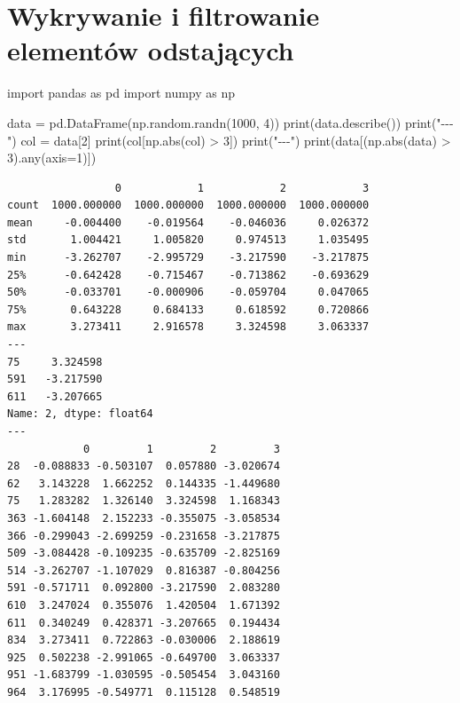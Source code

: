\documentclass[
  polish,
  letterpaper,
  DIV=11,
  numbers=noendperiod]{scrreprt}
\newenvironment{Shaded}{\begin{snugshade}}{\end{snugshade}}
\newcommand{\BuiltInTok}[1]{\textcolor[rgb]{0.00,0.23,0.31}{#1}}
\newcommand{\DecValTok}[1]{\textcolor[rgb]{0.68,0.00,0.00}{#1}}
\newcommand{\ImportTok}[1]{\textcolor[rgb]{0.00,0.46,0.62}{#1}}
\newcommand{\NormalTok}[1]{\textcolor[rgb]{0.00,0.23,0.31}{#1}}
\newcommand{\OperatorTok}[1]{\textcolor[rgb]{0.37,0.37,0.37}{#1}}
\newcommand{\StringTok}[1]{\textcolor[rgb]{0.13,0.47,0.30}{#1}}
\begin{document}
\section{Wykrywanie i filtrowanie elementów
odstających}\label{wykrywanie-i-filtrowanie-elementuxf3w-odstajux105cych}

\begin{Shaded}
\begin{Highlighting}[]
\ImportTok{import}\NormalTok{ pandas }\ImportTok{as}\NormalTok{ pd}
\ImportTok{import}\NormalTok{ numpy }\ImportTok{as}\NormalTok{ np}

\NormalTok{data }\OperatorTok{=}\NormalTok{ pd.DataFrame(np.random.randn(}\DecValTok{1000}\NormalTok{, }\DecValTok{4}\NormalTok{))}
\BuiltInTok{print}\NormalTok{(data.describe())}
\BuiltInTok{print}\NormalTok{(}\StringTok{"{-}{-}{-}"}\NormalTok{)}
\NormalTok{col }\OperatorTok{=}\NormalTok{ data[}\DecValTok{2}\NormalTok{]}
\BuiltInTok{print}\NormalTok{(col[np.}\BuiltInTok{abs}\NormalTok{(col) }\OperatorTok{\textgreater{}} \DecValTok{3}\NormalTok{])}
\BuiltInTok{print}\NormalTok{(}\StringTok{"{-}{-}{-}"}\NormalTok{)}
\BuiltInTok{print}\NormalTok{(data[(np.}\BuiltInTok{abs}\NormalTok{(data) }\OperatorTok{\textgreater{}} \DecValTok{3}\NormalTok{).}\BuiltInTok{any}\NormalTok{(axis}\OperatorTok{=}\DecValTok{1}\NormalTok{)])}
\end{Highlighting}
\end{Shaded}

\begin{verbatim}
                 0            1            2            3
count  1000.000000  1000.000000  1000.000000  1000.000000
mean     -0.004400    -0.019564    -0.046036     0.026372
std       1.004421     1.005820     0.974513     1.035495
min      -3.262707    -2.995729    -3.217590    -3.217875
25%      -0.642428    -0.715467    -0.713862    -0.693629
50%      -0.033701    -0.000906    -0.059704     0.047065
75%       0.643228     0.684133     0.618592     0.720866
max       3.273411     2.916578     3.324598     3.063337
---
75     3.324598
591   -3.217590
611   -3.207665
Name: 2, dtype: float64
---
            0         1         2         3
28  -0.088833 -0.503107  0.057880 -3.020674
62   3.143228  1.662252  0.144335 -1.449680
75   1.283282  1.326140  3.324598  1.168343
363 -1.604148  2.152233 -0.355075 -3.058534
366 -0.299043 -2.699259 -0.231658 -3.217875
509 -3.084428 -0.109235 -0.635709 -2.825169
514 -3.262707 -1.107029  0.816387 -0.804256
591 -0.571711  0.092800 -3.217590  2.083280
610  3.247024  0.355076  1.420504  1.671392
611  0.340249  0.428371 -3.207665  0.194434
834  3.273411  0.722863 -0.030006  2.188619
925  0.502238 -2.991065 -0.649700  3.063337
951 -1.683799 -1.030595 -0.505454  3.043160
964  3.176995 -0.549771  0.115128  0.548519
\end{verbatim}
\end{document}

